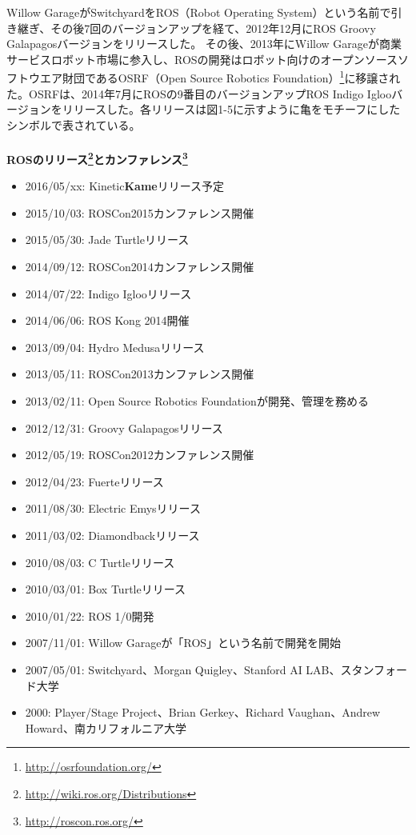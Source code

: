 Willow GarageがSwitchyardをROS（Robot Operating System）という名前で引き継ぎ、その後7回のバージョンアップを経て、2012年12月にROS Groovy Galapagosバージョンをリリースした。
その後、2013年にWillow Garageが商業サービスロボット市場に参入し、ROSの開発はロボット向けのオープンソースソフトウエア財団であるOSRF（Open Source Robotics Foundation）\footnote{\url{http://osrfoundation.org/}}に移譲された。OSRFは、2014年7月にROSの9番目のバージョンアップROS Indigo Iglooバージョンをリリースした。各リリースは図1-5に示すように亀をモチーフにしたシンボルで表されている。
\\\\
\textbf{ROSのリリース\footnote{\url{http://wiki.ros.org/Distributions}}とカンファレンス\footnote{\url{http://roscon.ros.org/}}}
\begin{itemize}[leftmargin=*]
\item  2016/05/xx: Kinetic\textbf{Kame}リリース予定
\item  2015/10/03: ROSCon2015カンファレンス開催
\item  2015/05/30: Jade Turtleリリース
\item  2014/09/12: ROSCon2014カンファレンス開催
\item  2014/07/22: Indigo Iglooリリース
\item  2014/06/06: ROS Kong 2014開催
\item  2013/09/04: Hydro Medusaリリース
\item  2013/05/11: ROSCon2013カンファレンス開催
\item  2013/02/11: Open Source Robotics Foundationが開発、管理を務める
\item  2012/12/31: Groovy Galapagosリリース
\item  2012/05/19: ROSCon2012カンファレンス開催
\item  2012/04/23: Fuerteリリース
\item  2011/08/30: Electric Emysリリース
\item  2011/03/02: Diamondbackリリース
\item  2010/08/03: C Turtleリリース
\item  2010/03/01: Box Turtleリリース
\item  2010/01/22: ROS 1/0開発
\item  2007/11/01: Willow Garageが「ROS」という名前で開発を開始
\item  2007/05/01: Switchyard、Morgan Quigley、Stanford AI LAB、スタンフォード大学
\item  2000: Player/Stage Project、Brian Gerkey、Richard Vaughan、Andrew Howard、南カリフォルニア大学
\end{itemize}


